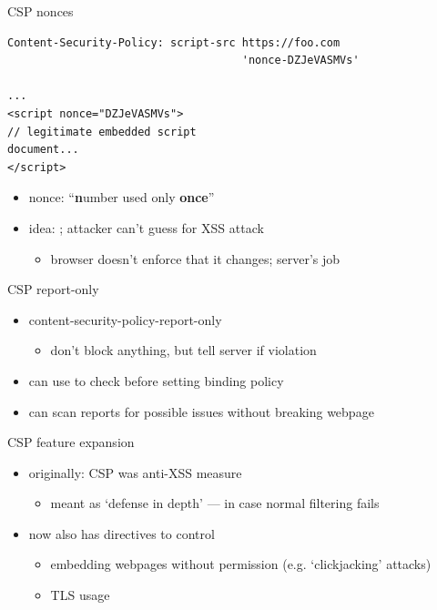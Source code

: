 \begin{frame}[fragile,label=CSPNonces]{CSP nonces}
\begin{verbatim}
Content-Security-Policy: script-src https://foo.com
                                    'nonce-DZJeVASMVs'

...
<script nonce="DZJeVASMVs">
// legitimate embedded script
document...
</script>
\end{verbatim}
    \begin{itemize}
    \item nonce: ``\textbf{n}umber used only \textbf{once}''
    \item idea: ; attacker can't guess for XSS attack
        \begin{itemize}
        \item browser doesn't enforce that it changes; server's job
        \end{itemize}
    \end{itemize}
\end{frame}

\begin{frame}{CSP report-only}
    \begin{itemize}
    \item content-security-policy-report-only
        \begin{itemize}
        \item don't block anything, but tell server if violation
        \end{itemize}
    \item can use to check before setting binding policy
    \item can scan reports for possible issues without breaking webpage
    \end{itemize}
\end{frame}

\begin{frame}{CSP feature expansion}
    \begin{itemize}
    \item originally: CSP was anti-XSS measure
        \begin{itemize}
        \item meant as `defense in depth' --- in case normal filtering fails
        \end{itemize}
    \item now also has directives to control
        \begin{itemize}
        \item embedding webpages without permission (e.g. `clickjacking' attacks)
        \item TLS usage
        \end{itemize}
    \end{itemize}
\end{frame}

